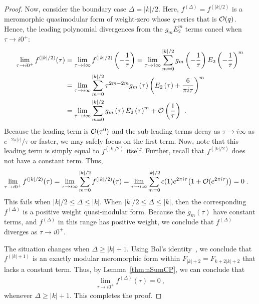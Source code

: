 \documentclass[11pt,a4paper]{article}
\begin{document}
\begin{proof}
Now, consider the boundary case $\Delta = |k|/2$. Here, $f^{(\Delta)} = f^{(|k|/2)}$ is a meromorphic quasimodular form of weight-zero whose $q$-series that is ${\cal O}(q)$. Hence, the leading polynomial divergences from the $g_m E_2^m$ terms cancel when $\tau \to i 0^+$:
\begin{align}
\lim_{\tau \to i 0^+} f^{(|k|/2)}(\tau) 
&= \lim_{\tau \to i \infty} f^{(|k|/2)}\left(-\frac{1}{\tau} \right) 
=  \lim_{\tau \to i \infty} \sum_{m = 0}^{|k|/2} g_m\left(-\frac{1}{\tau} \right) E_2\left(-\frac{1}{\tau} \right)^m \\
&=  \lim_{\tau \to i \infty} \sum_{m = 0}^{|k|/2} \tau^{2m-2m} g_m\left(\tau \right) \left( E_2\left(\tau \right) + \frac{6}{\pi i \tau} \right)^m \\
&=  \lim_{\tau \to i \infty} \sum_{m = 0}^{|k|/2} g_m\left(\tau \right) E_2\left(\tau \right)^m + {\cal O}\left(\frac{1}{\tau}  \right)~.\!\!
\end{align}
Because the leading term is ${\cal O}(\tau^0)$ and the sub-leading terms decay as $\tau \to i \infty$ as $e^{-2\pi|\tau|}/\tau$ or faster, we may safely focus on the first term. Now, note that this leading term is simply equal to $f^{(|k|/2)}$ itself. Further, recall that $f^{(|k|/2)}$ does not have a constant term. Thus,
\begin{align} 
\lim_{\tau \to i 0^+} f^{(|k|/2)}(\tau) 
&= \lim_{\tau \to i \infty} \sum_{m = 0}^{|k|/2}  f^{(|k|/2)}(\tau) 
= \lim_{\tau \to i \infty} \sum_{m = 0}^{|k|/2}  c(1) e^{2 \pi i \tau} \big(1 + {\cal O}(e^{2 \pi i \tau}) \big)  = 0~.
\end{align}
This fails when $|k|/2 \leq \Delta \leq |k|$. When $|k|/2 \leq \Delta \leq |k|$, then the corresponding $f^{(\Delta)}$ is a positive weight quasi-modular form. Because the $g_m(\tau)$ have constant terms, and $f^{(\Delta)}$ in this range has positive weight, we conclude that $f^{(\Delta)}$ diverges as $\tau \to i0^+$. 

The situation changes when $\Delta \geq |k| + 1$. Using Bol's identity~\cite{26-Bol1}, we conclude that $f^{(|k|+1)}$ is an exactly modular meromorphic form within $F_{|k|+2} = F_{k+2|k|+2}$ that lacks a constant term. Thus, by Lemma~\ref{thm:nSumCP}, we can conclude that
\begin{align}
\lim_{\tau \to i 0^+} f^{(\Delta)}(\tau) = 0~,
\end{align}
whenever $\Delta \geq |k|+1$. This completes the proof.
\end{proof}
\end{document}
